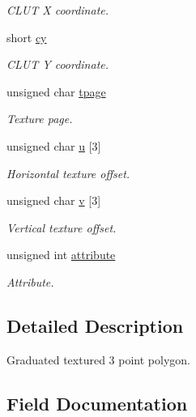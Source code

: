 \begin{DoxyCompactItemize}
\begin{DoxyCompactList}\small\item\em C\+L\+U\+T X coordinate. \end{DoxyCompactList}\item 
short \hyperlink{structGsGTPoly3_a1504800135de6f86d07517280dedf6cd}{cy}
\begin{DoxyCompactList}\small\item\em C\+L\+U\+T Y coordinate. \end{DoxyCompactList}\item 
unsigned char \hyperlink{structGsGTPoly3_ae9f3507974206172e48621b837b7f0c7}{tpage}
\begin{DoxyCompactList}\small\item\em Texture page. \end{DoxyCompactList}\item 
unsigned char \hyperlink{structGsGTPoly3_ac72eba19e1f30004e1fc469b59926236}{u} \mbox{[}3\mbox{]}
\begin{DoxyCompactList}\small\item\em Horizontal texture offset. \end{DoxyCompactList}\item 
unsigned char \hyperlink{structGsGTPoly3_a1a9b6fe80157c16a3848ae5ea9aaa0d7}{v} \mbox{[}3\mbox{]}
\begin{DoxyCompactList}\small\item\em Vertical texture offset. \end{DoxyCompactList}\item 
unsigned int \hyperlink{structGsGTPoly3_a974c933683a793903a7004911d45ff01}{attribute}
\begin{DoxyCompactList}\small\item\em Attribute. \end{DoxyCompactList}\end{DoxyCompactItemize}


\subsection{Detailed Description}
Graduated textured 3 point polygon. 

\subsection{Field Documentation}
\hypertarget{structGsGTPoly3_a974c933683a793903a7004911d45ff01}{}
